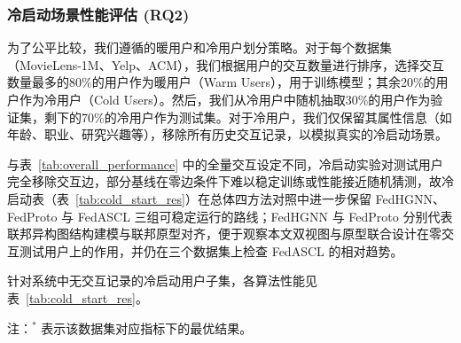 \subsubsection{冷启动场景性能评估 (RQ2)}
\label{subsubsec:cold_start}

为了公平比较，我们遵循\cite{zhang2024ifedrec}的暖用户和冷用户划分策略。对于每个数据集（MovieLens-1M、Yelp、ACM），我们根据用户的交互数量进行排序，选择交互数量最多的80\%的用户作为暖用户（Warm Users），用于训练模型；其余20\%的用户作为冷用户（Cold Users）。然后，我们从冷用户中随机抽取30\%的用户作为验证集，剩下的70\%的冷用户作为测试集。对于冷用户，我们仅保留其属性信息（如年龄、职业、研究兴趣等），移除所有历史交互记录，以模拟真实的冷启动场景。

与表~\ref{tab:overall_performance} 中的全量交互设定不同，冷启动实验对测试用户完全移除交互边，部分基线在零边条件下难以稳定训练或性能接近随机猜测，故冷启动表（表~\ref{tab:cold_start_res}）在总体四方法对照中进一步保留 FedHGNN、FedProto 与 FedASCL 三组可稳定运行的路线；FedHGNN 与 FedProto 分别代表联邦异构图结构建模与联邦原型对齐，便于观察本文双视图与原型联合设计在零交互测试用户上的作用，并仍在三个数据集上检查 FedASCL 的相对趋势。

针对系统中无交互记录的冷启动用户子集，各算法性能见表~\ref{tab:cold_start_res}。

\begin{table}[H]
    \centering
    \caption{冷启动用户场景下的性能对比（Hit@10 与 NDCG@10）}
    \label{tab:cold_start_res}
    {\wuhao\songti 注：$^*$ 表示该数据集对应指标下的最优结果。}
\end{table}

